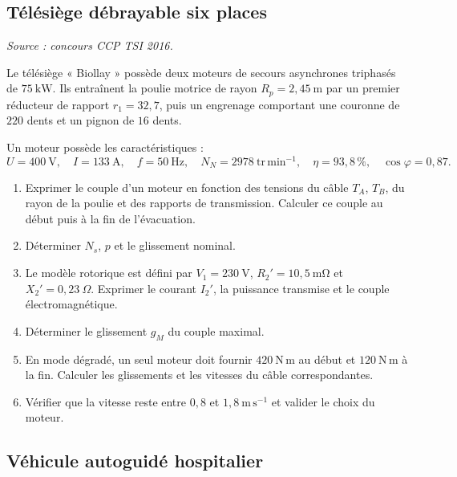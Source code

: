 
\subsection{Télésiège débrayable six places}

\textit{Source : concours CCP TSI 2016.}


Le télésiège « Biollay » possède deux moteurs de secours asynchrones triphasés de $75\ \mathrm{kW}$. Ils entraînent la poulie motrice de rayon $R_p=2{,}45\ \mathrm m$ par un premier réducteur de rapport $r_1=32{,}7$, puis un engrenage comportant une couronne de $220$ dents et un pignon de $16$ dents.

Un moteur possède les caractéristiques :
\[
U=400\ \mathrm V,\quad I=133\ \mathrm A,\quad f=50\ \mathrm{Hz},\quad
N_N=2978\ \mathrm{tr\,min^{-1}},\quad \eta=93{,}8\,\%,\quad \cos\varphi=0{,}87.
\]

\begin{enumerate}
  \item Exprimer le couple d'un moteur en fonction des tensions du câble $T_A$, $T_B$, du rayon de la poulie et des rapports de transmission. Calculer ce couple au début puis à la fin de l'évacuation.
  \item Déterminer $N_s$, $p$ et le glissement nominal.
  \item Le modèle rotorique est défini par $V_1=230\ \mathrm V$, $R_2'=10{,}5\ \mathrm{m\Omega}$ et $X_2'=0{,}23\ \Omega$. Exprimer le courant $I_2'$, la puissance transmise et le couple électromagnétique.
  \item Déterminer le glissement $g_M$ du couple maximal.
  \item En mode dégradé, un seul moteur doit fournir $420\ \mathrm{N\,m}$ au début et $120\ \mathrm{N\,m}$ à la fin. Calculer les glissements et les vitesses du câble correspondantes.
  \item Vérifier que la vitesse reste entre $0{,}8$ et $1{,}8\ \mathrm{m\,s^{-1}}$ et valider le choix du moteur.
\end{enumerate}

\subsection{Véhicule autoguidé hospitalier}

